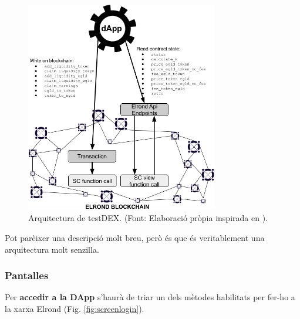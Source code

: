 \documentclass[11pt,a4paper]{article}
\begin{document}
\begin{figure}[h]
\includegraphics[width=0.75\textwidth]{architecture.png}
\centering
\caption{Arquitectura de testDEX. (Font: Elaboració pròpia inspirada en \cite{elrond2022}).}\label{fig:architecture}
\end{figure} 

Pot parèixer una descripció molt breu, però és que és veritablement una arquitectura molt senzilla.

\subsubsection{Pantalles}

Per \textbf{accedir a la DApp} s'haurà de triar un dels mètodes habilitats per fer-ho a la xarxa Elrond (Fig. \ref{fig:screenlogin}).
\end{document}
